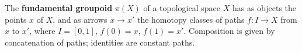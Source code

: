 The \textbf{fundamental groupoid} $\pi(X)$ of a topological space $X$ has as objects the points $x$ of $X$, and as arrows $x \rightarrow x'$ the homotopy classes of paths $f: I \rightarrow X$ from $x$ to $x'$, where $I = [0,1]$, $f(0) = x$, $f(1) = x'$. Composition is given by concatenation of paths; identities are constant paths.